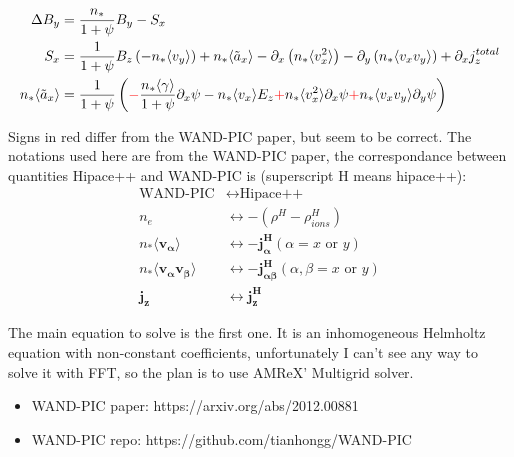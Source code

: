 \documentclass{article}
\begin{document}
\begin{subequations}
    \begin{align}
    \Delta B_y &= \frac{n_*}{1+\psi} B_y - S_x \\
    S_x &= \frac{1}{1+\psi} B_z \left(-n_* \langle v_y\rangle \right) + n_* \langle \tilde{a}_x \rangle - \partial_x\left( n_*\langle v_x^2 \rangle \right) - \partial_y\left( n_*\langle v_x v_y \rangle \right) + \partial_x j_z^{total} \\
    n_* \langle \tilde{a}_x \rangle &= \frac{1}{1+\psi} \left( \textcolor{red}{-}\frac{n_*\langle\gamma\rangle}{1+\psi}\partial_x\psi - n_* \langle v_x \rangle E_z \textcolor{red}{+} n_* \langle v_x^2\rangle \partial_x\psi \textcolor{red}{+} n_* \langle v_x v_y \rangle \partial_y\psi \right) \\
    \end{align}
\end{subequations}

Signs in red differ from the WAND-PIC paper, but seem to be correct. The notations used here are from the WAND-PIC paper, the correspondance between quantities Hipace++ and WAND-PIC is (superscript H means hipace++):
\begin{subequations}
\begin{align}
\text{WAND-PIC} &\leftrightarrow \text{Hipace++} \\
n_e &\leftrightarrow -(\rho^H-\rho_{ions}^H) \\
n_*\langle \bm{v_\alpha}\rangle &\leftrightarrow -\bm{j_\alpha^H} (\alpha = x \text{ or } y) \\
n_*\langle \bm{v_\alpha v_\beta}\rangle &\leftrightarrow -\bm{j_{\alpha\beta}^H} (\alpha, \beta = x \text{ or } y) \\
\bm{j_z} &\leftrightarrow \bm{j_z^H}
\end{align}
\end{subequations}

The main equation to solve is the first one. It is an inhomogeneous Helmholtz equation with non-constant coefficients, unfortunately I can't see any way to solve it with FFT, so the plan is to use AMReX' Multigrid solver.

\begin{itemize}
\item WAND-PIC paper: https://arxiv.org/abs/2012.00881
\item WAND-PIC repo: https://github.com/tianhongg/WAND-PIC
\end{itemize}
\end{document}
